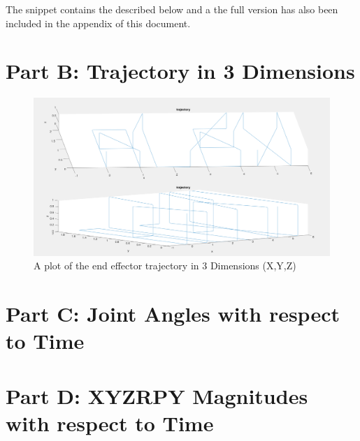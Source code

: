 \documentclass[a4paper, 10pt]{article}
\begin{document}
The snippet contains the described below and a the full version has also been included in the appendix of this document.


\section{Part B: Trajectory in 3 Dimensions}

\begin{figure}[H]
  \includegraphics[width=\linewidth]{images/T2}
  \caption{A plot of the end effector trajectory in 3 Dimensions (X,Y,Z)}
  \label{fig:A plot of the end effector trajectory in 3 Dimensions (X,Y,Z)}
\end{figure}


\section{Part C: Joint Angles with respect to Time}



\section{Part D: XYZRPY Magnitudes with respect to Time}
\end{document}
